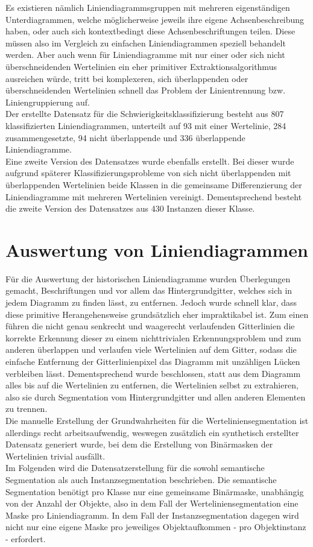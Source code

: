 Es existieren nämlich Liniendiagrammsgruppen mit mehreren eigenständigen Unterdiagrammen, welche möglicherweise jeweils ihre eigene Achsenbeschreibung haben, oder auch sich kontextbedingt diese Achsenbeschriftungen teilen. Diese müssen also im Vergleich zu einfachen Liniendiagrammen speziell behandelt werden. Aber auch wenn für Liniendiagramme mit nur einer oder sich nicht überschneidenden Wertelinien ein eher primitiver Extraktionsalgorithmus ausreichen würde, tritt bei komplexeren, sich überlappenden oder überschneidenden Wertelinien schnell das Problem der Linientrennung bzw. Liniengruppierung auf.
\\
Der erstellte Datensatz für die Schwierigkeitsklassifizierung besteht aus 807 klassifizierten Liniendiagrammen, unterteilt auf 93 mit einer Wertelinie, 284 zusammengesetzte, 94 nicht überlappende und 336 überlappende Liniendiagramme.
\\
Eine zweite Version des Datensatzes wurde ebenfalls erstellt. Bei dieser wurde aufgrund späterer Klassifizierungsprobleme von sich nicht überlappenden mit überlappenden Wertelinien beide Klassen in die gemeinsame Differenzierung der Liniendiagramme mit mehreren Wertelinien vereinigt. Dementsprechend besteht die zweite Version des Datensatzes aus 430 Instanzen dieser Klasse.

\section{Auswertung von Liniendiagrammen}

Für die Auswertung der historischen Liniendiagramme wurden Überlegungen gemacht, Beschriftungen und vor allem das Hintergrundgitter, welches sich in jedem Diagramm zu finden lässt, zu entfernen. Jedoch wurde schnell klar, dass diese primitive Herangehensweise grundsätzlich eher impraktikabel ist. Zum einen führen die nicht genau senkrecht und waagerecht verlaufenden Gitterlinien die korrekte Erkennung dieser zu einem nichttrivialen Erkennungsproblem und zum anderen überlappen und verlaufen viele Wertelinien auf dem Gitter, sodass die einfache Entfernung der Gitterlinienpixel das Diagramm mit unzähligen Lücken verbleiben lässt. Dementsprechend wurde beschlossen, statt aus dem Diagramm alles bis auf die Wertelinien zu entfernen, die Wertelinien selbst zu extrahieren, also sie durch Segmentation vom Hintergrundgitter und allen anderen Elementen zu trennen.
\\
Die manuelle Erstellung der Grundwahrheiten für die Werteliniensegmentation ist allerdings recht arbeitsaufwendig, weswegen zusätzlich ein synthetisch erstellter Datensatz generiert wurde, bei dem die Erstellung von Binärmasken der Wertelinien trivial ausfällt.
\\
Im Folgenden wird die Datensatzerstellung für die sowohl semantische Segmentation als auch Instanzsegmentation beschrieben. Die semantische Segmentation benötigt pro Klasse nur eine gemeinsame Binärmaske, unabhängig von der Anzahl der Objekte, also in dem Fall der Werteliniensegmentation eine Maske pro Liniendiagramm. In dem Fall der Instanzsegmentation dagegen wird nicht nur eine eigene Maske pro jeweiliges Objektaufkommen - pro Objektinstanz - erfordert.

